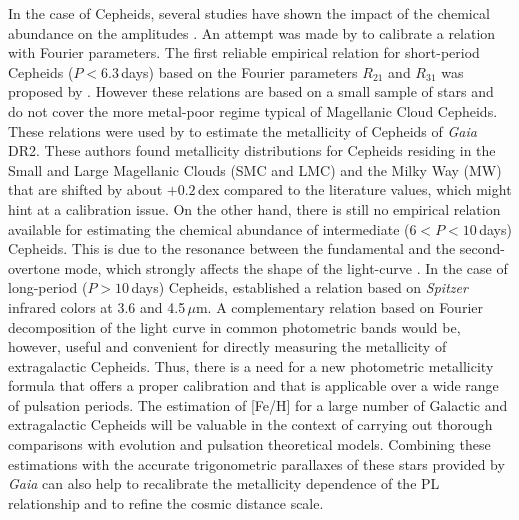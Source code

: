 \documentclass[article]{aa} %
\begin{document}
In the case of Cepheids, several studies have shown the impact of the chemical abundance on the amplitudes \citep{Klagyivik2007,Bono2000,SzabadosKla2012AMP,Majaess2013}. An attempt was made by \cite{Zsoldos1995} to calibrate a relation with Fourier parameters. The first reliable empirical relation for short-period Cepheids ($P<6.3\,$days) based on the Fourier parameters $R_{21}$ and $R_{31}$ was proposed by \cite{Klagyivik2013}. However these relations are based on a small sample of stars and do not cover the more metal-poor regime typical of Magellanic Cloud Cepheids. These relations were used by \cite{Clementini2019} to estimate the metallicity of Cepheids of \textit{Gaia} DR2. These authors found metallicity distributions for Cepheids residing in the Small and Large
Magellanic Clouds (SMC and LMC) and the Milky Way (MW) that are shifted by about $+0.2\,$dex compared to the literature values, which might hint at a calibration issue. 
On the other hand, there is still no empirical relation available for estimating the chemical abundance of intermediate ($6<P<10\,$days) Cepheids. This is due to the resonance between the fundamental and the second-overtone mode, which strongly affects the shape of the light-curve \citep{SimonSchmidt1976,Buchler1990}.  In the case of long-period ($P>10\,$days) Cepheids, \cite{scowcroft2016} established a relation based on \textit{Spitzer} infrared colors at 3.6 and 4.5$\,\mu$m. A complementary relation based on Fourier decomposition of the light curve in common photometric bands would be, however, useful and convenient for directly measuring the metallicity of extragalactic Cepheids. Thus, there is a need for a new photometric metallicity formula that offers a proper calibration and that is applicable over a wide range of pulsation periods. The estimation of [Fe/H] for a large number of Galactic and extragalactic Cepheids will be valuable in the context of carrying out thorough comparisons with evolution and pulsation theoretical models. Combining these estimations with the accurate trigonometric parallaxes of these stars provided by \textit{Gaia} can also help to recalibrate the metallicity dependence of the PL relationship and to refine the cosmic distance scale.
\end{document}
